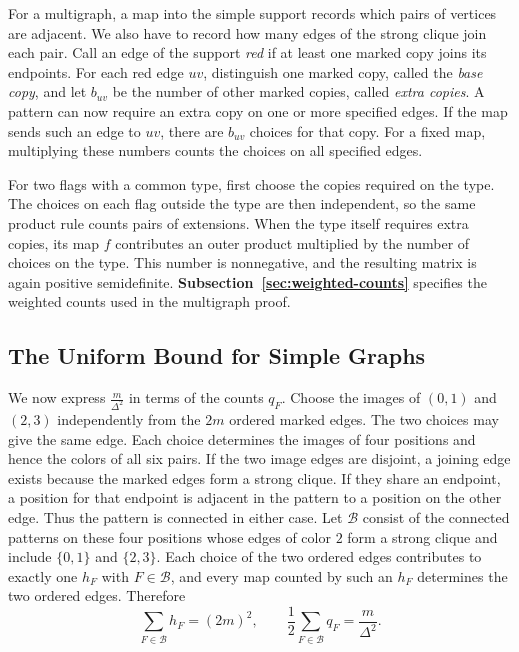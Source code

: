 \documentclass[preprint,11pt,numbers]{elsarticle-arxiv}
\numberwithin{equation}{section}
\theoremstyle{definition}
\begin{document}
For a multigraph, a map into the simple support records which pairs
of vertices are adjacent. We also have to record how many edges of
the strong clique join each pair. Call an edge of the support
\emph{red} if at least one marked copy joins its endpoints. For each
red edge $uv$, distinguish one marked copy, called the \emph{base
copy}, and let $b_{uv}$ be the number of other marked copies, called
\emph{extra copies}. A pattern can now require an extra copy on one
or more specified edges. If the map sends such an edge to $uv$, there
are $b_{uv}$ choices for that copy. For a fixed map, multiplying
these numbers counts the choices on all specified edges.

For two flags with a common type, first choose the copies required
on the type. The choices on each flag outside the type are then
independent, so the same product rule counts pairs of extensions.
When the type itself requires extra copies, its map $f$ contributes
an outer product multiplied by the number of choices on the type.
This number is nonnegative, and the resulting matrix is again positive
semidefinite. \textbf{Subsection~\ref{sec:weighted-counts}} specifies
the weighted counts used in the multigraph proof.

\subsection{The Uniform Bound for Simple Graphs}\label{subsec:marked-edge-pairs}

We now express $\frac{m}{\Delta^2}$ in terms of the counts $q_F$.
Choose the images of $(0,1)$ and $(2,3)$ independently from the $2m$
ordered marked edges. The two choices may give the same edge. Each
choice determines the images of four positions and hence the colors of
all six pairs. If the two image edges are disjoint, a joining edge
exists because the marked edges form a strong clique. If they share
an endpoint, a position for that endpoint is adjacent in the pattern
to a position on the other edge. Thus the pattern is connected in
either case. Let $\mathcal B$ consist of the connected patterns on
these four positions whose edges of color $2$ form a strong clique
and include $\{0,1\}$ and $\{2,3\}$. Each choice of the two ordered
edges contributes to exactly one $h_F$ with $F\in\mathcal B$, and
every map counted by such an $h_F$ determines the two ordered edges.
Therefore
\[
 \sum_{F\in\mathcal B}h_F=(2m)^2,\qquad
 \frac{1}{2}\sum_{F\in\mathcal B}q_F=\frac{m}{\Delta^2}.
\]
\end{document}
